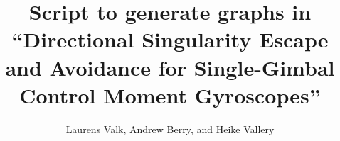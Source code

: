 \documentclass{revtex4-1}
\begin{document}
\title{Script to generate graphs in ``Directional Singularity Escape and Avoidance for Single-Gimbal Control Moment Gyroscopes''}

\author{Laurens Valk, Andrew Berry, and Heike Vallery}

\maketitle

\begin{figure}

\end{figure}

\clearpage

\begin{figure}

\end{figure} 

\clearpage



\begin{figure}

\end{figure}

\clearpage


\begin{figure}

\end{figure}
\end{document}
